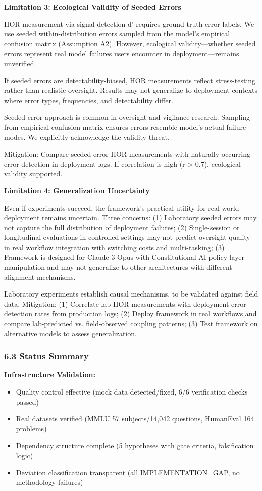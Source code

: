 \textbf{Limitation 3: Ecological Validity of Seeded Errors}

HOR measurement via signal detection d' requires ground-truth error labels. We use seeded within-distribution errors sampled from the model's empirical confusion matrix (Assumption A2). However, ecological validity—whether seeded errors represent real model failures users encounter in deployment—remains unverified.

If seeded errors are detectability-biased, HOR measurements reflect stress-testing rather than realistic oversight. Results may not generalize to deployment contexts where error types, frequencies, and detectability differ.

Seeded error approach is common in oversight and vigilance research. Sampling from empirical confusion matrix ensures errors resemble model's actual failure modes. We explicitly acknowledge the validity threat.

Mitigation: Compare seeded error HOR measurements with naturally-occurring error detection in deployment logs. If correlation is high (r > 0.7), ecological validity supported.

\textbf{Limitation 4: Generalization Uncertainty}

Even if experiments succeed, the framework's practical utility for real-world deployment remains uncertain. Three concerns: (1) Laboratory seeded errors may not capture the full distribution of deployment failures; (2) Single-session or longitudinal evaluations in controlled settings may not predict oversight quality in real workflow integration with switching costs and multi-tasking; (3) Framework is designed for Claude 3 Opus with Constitutional AI policy-layer manipulation and may not generalize to other architectures with different alignment mechanisms.

Laboratory experiments establish causal mechanisms, to be validated against field data. Mitigation: (1) Correlate lab HOR measurements with deployment error detection rates from production logs; (2) Deploy framework in real workflows and compare lab-predicted vs. field-observed coupling patterns; (3) Test framework on alternative models to assess generalization.

\subsubsection{6.3 Status Summary}

\textbf{Infrastructure Validation:}
\begin{itemize}
\item Quality control effective (mock data detected/fixed, 6/6 verification checks passed)
\item Real datasets verified (MMLU 57 subjects/14,042 questions, HumanEval 164 problems)
\item Dependency structure complete (5 hypotheses with gate criteria, falsification logic)
\item Deviation classification transparent (all IMPLEMENTATION_GAP, no methodology failures)
\end{itemize}

